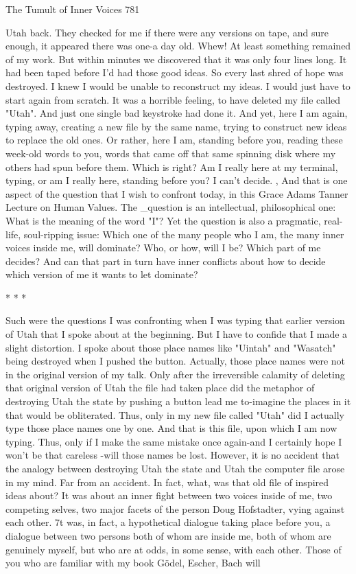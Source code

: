 The Tumult of Inner Voices                                                          781

Utah back. They checked for me if there were any versions on tape, and sure enough,
it appeared there was one-a day old. Whew! At least something remained of my work.
But within minutes we discovered that it was only four lines long. It had been taped
before I'd had those good ideas. So every last shred of hope was destroyed.
        I knew I would be unable to reconstruct my ideas. I would just have to start
again from scratch. It was a horrible feeling, to have deleted my file called "Utah".
And just one single bad keystroke had done it. And yet, here I am again, typing away,
creating a new file by the same name, trying to construct new ideas to replace the old
ones. Or rather, here I am, standing before you, reading these week-old words to you,
words that came off that same spinning disk where my others had spun before them.
        Which is right? Am I really here at my terminal, typing, or am I really here,
standing before you? I can't decide. ,
        And that is one aspect of the question that I wish to confront today, in this
Grace Adams Tanner Lecture on Human Values. The \_question is an intellectual,
philosophical one: What is the meaning of the word "I"? Yet the question is also a
pragmatic, real-life, soul-ripping issue: Which one of the many people who I am, the
many inner voices inside me, will dominate? Who, or how, will I be? Which part of
me decides? And can that part in turn have inner conflicts about how to decide which
version of me it wants to let dominate?

                                      *   *   *

        Such were the questions I was confronting when I was typing that earlier
version of Utah that I spoke about at the beginning. But I have to confide that I made
a slight distortion. I spoke about those place names like "Uintah" and "Wasatch"
being destroyed when I pushed the button. Actually, those place names were not in
the original version of my talk. Only after the irreversible calamity of deleting that
original version of Utah the file had taken place did the metaphor of destroying Utah
the state by pushing a button lead me to-imagine the places in it that would be
obliterated. Thus, only in my new file called "Utah" did I actually type those place
names one by one. And that is this file, upon which I am now typing. Thus, only if I
make the same mistake once again-and I certainly hope I won't be that careless -will
those names be lost.
        However, it is no accident that the analogy between destroying Utah the state
and Utah the computer file arose in my mind. Far from an accident. In fact, what, was
that old file of inspired ideas about? It was about an inner fight between two voices
inside of me, two competing selves, two major facets of the person Doug Hofstadter,
vying against each other. 7t was, in fact, a hypothetical dialogue taking place before
you, a dialogue between two persons both of whom are inside me, both of whom are
genuinely myself, but who are at odds, in some sense, with each other.
        Those of you who are familiar with my book Gödel, Escher, Bach will




